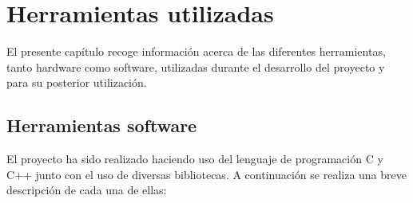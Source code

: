 

\chapter{Herramientas utilizadas}
\label{chap:herramientas} 

El presente capítulo recoge información acerca de las diferentes herramientas, tanto hardware como software, utilizadas durante el desarrollo del proyecto y para su posterior utilización. 

\section {Herramientas software}

El proyecto ha sido realizado haciendo uso del lenguaje de programación C y C++ junto con el uso de diversas bibliotecas. A continuación se realiza una breve descripción de cada una de ellas:

